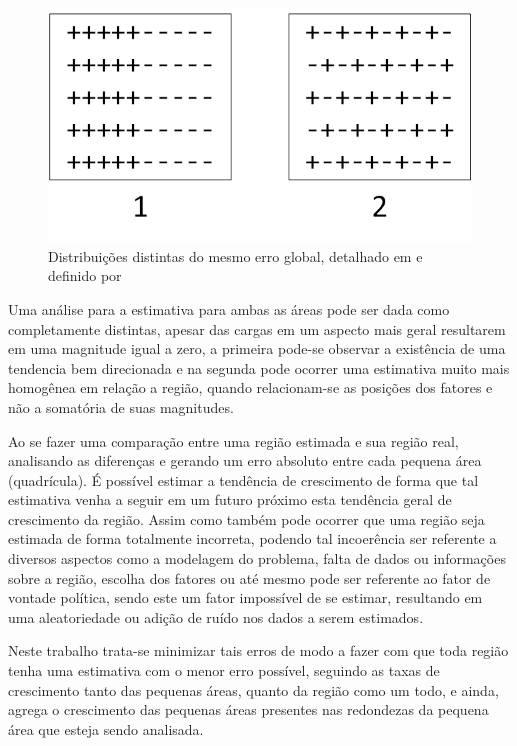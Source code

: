 \begin{figure}[h]
	\centering	
	\includegraphics[scale=2]{Figuras/Ilustration-ErrorDistArango.png}
	\caption{Distribuições distintas do mesmo erro global, detalhado em \cite{arango2000thesis} e definido por \cite{willis1995spatial}}
	\label{fig:ErrorDistArango}
\end{figure}

Uma análise para a estimativa para ambas as áreas pode ser dada como completamente distintas, apesar das cargas em um aspecto mais geral resultarem em uma magnitude igual a zero, a primeira pode-se observar a existência de uma tendencia bem direcionada e na segunda pode ocorrer uma estimativa muito mais homogênea em relação a região, quando relacionam-se as posições dos fatores e não a somatória de suas magnitudes. 

Ao se fazer uma comparação entre uma região estimada e sua região real, analisando as diferenças e gerando um erro absoluto entre cada pequena área (quadrícula). É possível estimar a tendência de crescimento de forma que tal estimativa venha a seguir em um futuro próximo esta tendência geral de crescimento da região. Assim como também pode ocorrer que uma região seja estimada de forma totalmente incorreta, podendo tal incoerência ser referente a diversos aspectos como a modelagem do problema, falta de dados ou informações sobre a região, escolha dos fatores ou até mesmo pode ser referente ao fator de vontade política, sendo este um fator impossível de se estimar, resultando em uma aleatoriedade ou adição de ruído nos dados a serem estimados.

Neste trabalho trata-se minimizar tais erros de modo a fazer com que toda região tenha uma estimativa com o menor erro possível, seguindo as taxas de crescimento tanto das pequenas áreas, quanto da região como um todo, e ainda, agrega o crescimento das pequenas áreas presentes nas redondezas da pequena área que esteja sendo analisada.


